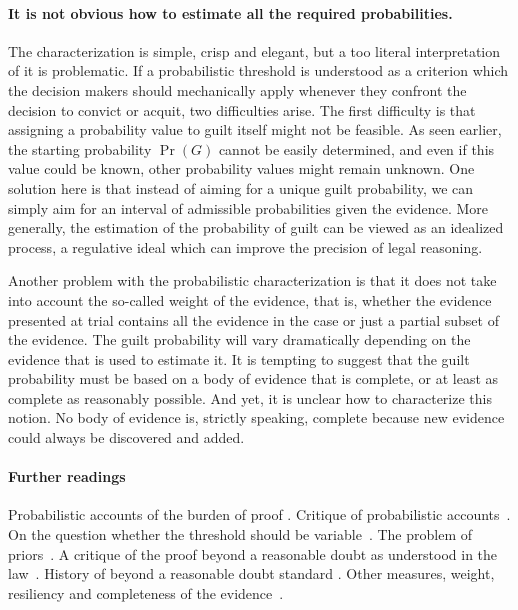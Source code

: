 \documentclass[10pt]{article}
\begin{document}

\paragraph{It is not obvious how to estimate all the required probabilities.}

The characterization is simple, crisp and elegant, but a too literal interpretation of it is problematic. If a probabilistic threshold is understood as a criterion which the decision makers 
 should mechanically apply whenever they confront the decision to convict or acquit, two difficulties arise. The first difficulty is that assigning a probability value to guilt itself might not be feasible. As seen earlier, the starting probability $\Pr(G)$ cannot be easily determined, 
and even if this value could be known, other probability values might remain unknown. One solution here is that instead 
 of aiming for a unique guilt probability, we can simply aim for an interval of admissible probabilities given the evidence. 
 More generally, the estimation of the probability of guilt can be viewed as an idealized process, a regulative ideal which can improve the precision of legal reasoning. 

Another problem with the probabilistic characterization 
is that it does not take into account the so-called weight of the evidence, that is, whether the evidence presented at trial contains all the evidence 
in the case or just a partial subset of the evidence. The guilt probability will vary dramatically 
depending on the evidence that is used to estimate it. It is tempting to suggest that the guilt probability must be based on a body 
of evidence that is complete, or at least as complete as reasonably possible. And yet, it is unclear how to characterize this notion.
No body of evidence is, strictly speaking, complete because new evidence could always be discovered and added. 

\paragraph{Further readings}

Probabilistic accounts of the burden of proof
\citep{kaplan1968, kaye1986, kaye1999, hamer2004, cheng2013}.
Critique of probabilistic accounts~\citep{cohen1977, nesson79, thomson86, stein05, ho08, pardoAllen2008, haack2014}.
On the question whether the threshold should be variable~\citep{kaplow2012, picinali2013}.
The problem of priors~\citep{finkelsteinFairley1970, friedman2000}.
A critique of the proof beyond a reasonable doubt 
as understood in the law~\citep{laudan2006}.
History of beyond a reasonable doubt standard 
\citep{shapiro1991, whitman2008}. Other measures, weight, resiliency and completeness 
of the evidence~\citep{kaye1999, stein05, nance2016}.
\end{document}
